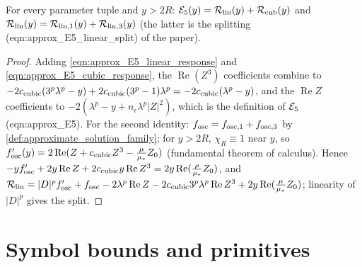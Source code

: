 \begin{lemma}
  \label{lem:c05_E5_split}
  For every parameter tuple and $y>2R$: $\mathcal{E}_5(y)=\mathcal{R}_{\textup{lin}}(y)+\mathcal{R}_{\textup{cub}}(y)$ and
  $\mathcal{R}_{\textup{lin}}(y)=\mathcal{R}_{\textup{lin},1}(y)+\mathcal{R}_{\textup{lin},3}(y)$
  (the latter is the splitting (eqn:approx\_E5\_linear\_split) of the paper).
\end{lemma}
\begin{proof}
  Adding \eqref{eqn:approx_E5_linear_response} and \eqref{eqn:approx_E5_cubic_response}, the
  $\operatorname{Re}(Z^3)$ coefficients combine to $-2c_{\textup{cubic}}(3^p\lambda^p-y)+2c_{\textup{cubic}}(3^p-1)\lambda^p
  =-2c_{\textup{cubic}}(\lambda^p-y)$, and the $\operatorname{Re}Z$ coefficients to $-2(\lambda^p-y+n_\epsilon\lambda^p|Z|^2)$,
  which is the definition of $\mathcal{E}_5$ (eqn:approx\_E5). For the second identity: $f_{\textup{osc}}=f_{\textup{osc},1}+f_{\textup{osc},3}$
  by \cref{def:approximate_solution_family}; for $y>2R$, $\chi_R\equiv1$ near $y$, so
  $f_{\textup{osc}}'(y)=2\operatorname{Re}(Z+c_{\textup{cubic}}Z^3-\frac{\mu}{\mu_*}Z_0)$ (fundamental theorem of calculus).
  Hence $-yf'_{\textup{osc}}+2y\operatorname{Re}Z+2c_{\textup{cubic}}y\operatorname{Re}Z^3=2y\operatorname{Re}(\frac{\mu}{\mu_*}Z_0)$, and
  $\mathcal{R}_{\textup{lin}}=|D|^pf'_{\textup{osc}}+f_{\textup{osc}}-2\lambda^p\operatorname{Re}Z-2c_{\textup{cubic}}3^p\lambda^p\operatorname{Re}Z^3+2y\operatorname{Re}(\frac{\mu}{\mu_*}Z_0)$;
  linearity of $|D|^p$ gives the split.
\end{proof}

\section{Symbol bounds and primitives}

